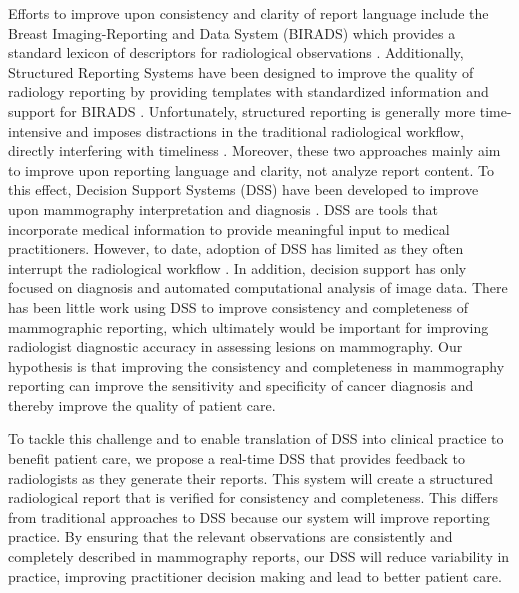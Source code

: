 Efforts to improve upon consistency and clarity of report language include the Breast Imaging-Reporting and Data System (BIRADS) which provides a standard lexicon of descriptors for radiological observations \cite{Liberman:ws}. Additionally, Structured Reporting Systems have been designed to improve the quality of radiology reporting by providing templates with standardized information and support for BIRADS \cite{Reiner:2009ib}. Unfortunately, structured reporting is generally more time-intensive and imposes distractions in the traditional radiological workflow, directly interfering with timeliness \cite{Weiss:2008er}. Moreover, these two approaches mainly aim to improve upon reporting language and clarity, not analyze report content. To this effect, Decision Support Systems (DSS) have been developed to improve upon mammography interpretation and diagnosis \cite{Garg:2005cb, Burnside:2000wl, ElizabethS:2005gc, Rubin:2005jg}. DSS are tools that incorporate medical information to provide meaningful input to medical practitioners. However, to date, adoption of DSS has limited as they often interrupt the radiological workflow \cite{Morgan:2011ct}. In addition, decision support has only focused on diagnosis and automated computational analysis of image data. There has been little work using DSS to improve consistency and completeness of mammographic reporting, which ultimately would be important for improving radiologist diagnostic accuracy in assessing lesions on mammography. Our hypothesis is that improving the consistency and completeness in mammography reporting can improve the sensitivity and specificity of cancer diagnosis and thereby improve the quality of patient care.

To tackle this challenge and to enable translation of DSS into clinical practice to benefit patient care, we propose a real-time DSS that provides feedback to radiologists as they generate their reports. This system will create a structured radiological report that is verified for consistency and completeness. This differs from traditional approaches to DSS because our system will improve reporting practice. By ensuring that the relevant observations are consistently and completely described in mammography reports, our DSS will reduce variability in practice, improving practitioner decision making and lead to better patient care.
